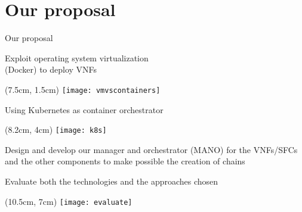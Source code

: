 \section{Our proposal}

\begin{frame}{Our proposal}

  \vspace*{1cm}

  Exploit operating system virtualization\\ (Docker) to deploy VNFs

  \begin{textblock*}{1cm}(7.5cm, 1.5cm)
    \texttt{[image: vmvscontainers]}
  \end{textblock*}


  \vspace{1.2cm}

  Using Kubernetes as container orchestrator

  \vspace{1cm}

  \begin{textblock*}{1cm}(8.2cm, 4cm)
    \texttt{[image: k8s]}
  \end{textblock*}

  Design and develop our manager and orchestrator (MANO) for the VNFs/SFCs and
  the other components to make possible the creation of chains

  \vspace{0.8cm}

  Evaluate both the technologies and the approaches chosen

  \vspace{1cm}

  \begin{textblock*}{1cm}(10.5cm, 7cm)
    \texttt{[image: evaluate]}
  \end{textblock*}

\end{frame}